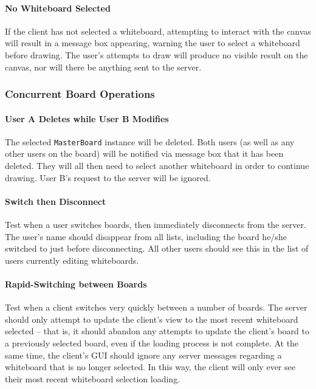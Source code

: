 \paragraph{No Whiteboard Selected}
If the client has not selected a whiteboard, attempting to interact with the canvas will result in a message box appearing, warning the user to select a whiteboard before drawing. The user’s attempts to draw will produce no visible result on the canvas, nor will there be anything sent to the server.

\subsubsection{Concurrent Board Operations}

\paragraph{User A Deletes while User B Modifies}
The selected \texttt{MasterBoard} instance will be deleted. Both users (as well as any other users on the board) will be notified via message box that it has been deleted. They will all then need to select another whiteboard in order to continue drawing. User B’s request to the server will be ignored.

\paragraph{Switch then Disconnect}
Test when a user switches boards, then immediately disconnects from the server. The user’s name should disappear from all lists, including the board he/she switched to just before disconnecting. All other users should see this in the list of users currently editing whiteboards.

\paragraph{Rapid-Switching between Boards}
Test when a client switches very quickly between a number of boards.  The server should only attempt to update the client’s view to the most recent whiteboard selected – that is, it should abandon any attempts to update the client’s board to a previously selected board, even if the loading process is not complete. At the same time, the client’s GUI should ignore any server messages regarding a whiteboard that is no longer selected. In this way, the client will only ever see their most recent whiteboard selection loading.

